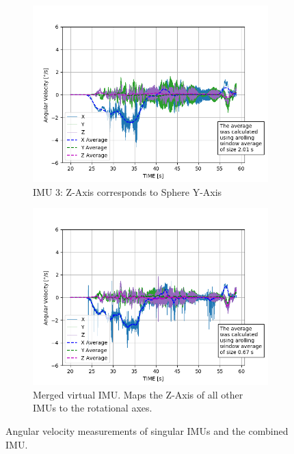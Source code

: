\begin{figure}
\begin{subfigure}{0.45\textwidth}
\includegraphics[width=\textwidth]{./plotsAndScripts/angVel-2020-01-29-16-14-54/imu3_ang_vel}
\caption{IMU 3: Z-Axis corresponds to Sphere Y-Axis}
\label{sec:technicalApproach:fig:imu3_ang_vel}
\end{subfigure}\hfill
\begin{subfigure}{0.45\textwidth}
\includegraphics[width=\textwidth]{./plotsAndScripts/angVel-2020-01-29-16-14-54/merged_ang_vel}
\caption{Merged virtual IMU. Maps the Z-Axis of all other IMUs to the rotational axes.}
\label{sec:technicalApproach:fig:merged_ang_vel}
\end{subfigure}\hfill
\caption{Angular velocity measurements of singular IMUs and the combined IMU.}
\label{sec:technicalApproach:fig:angvel}
\end{figure}


